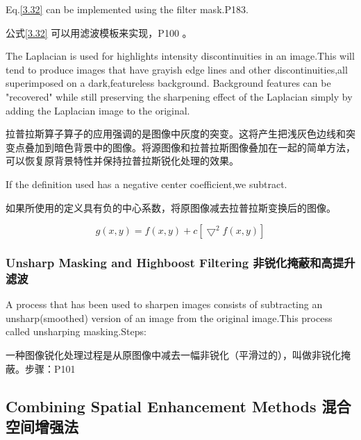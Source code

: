\documentclass[a4paper,12pt]{article}
\numberwithin{equation}{section}%
\begin{document}
Eq.\ref{3.32} can be implemented using the filter mask.P183.

公式\ref{3.32} 可以用滤波模板来实现，P100 。

The Laplacian is used for highlights intensity discontinuities in an image.This will tend to produce images that have grayish edge lines and other discontinuities,all superimposed on a dark,featureless background.
Background features can be "recovered" while still preserving the sharpening effect of the Laplacian simply by adding the Laplacian image to the original.

拉普拉斯算子算子的应用强调的是图像中灰度的突变。这将产生把浅灰色边线和突变点叠加到暗色背景中的图像。将源图像和拉普拉斯图像叠加在一起的简单方法，可以恢复原背景特性并保持拉普拉斯锐化处理的效果。

If the definition used has a negative center coefficient,we subtract.

如果所使用的定义具有负的中心系数，将原图像减去拉普拉斯变换后的图像。

\begin{equation} \label{3.33}
g(x,y)=f(x,y)+c[\bigtriangledown^{2}f(x,y)]
\end{equation}

\subsubsection{Unsharp Masking and Highboost Filtering 非锐化掩蔽和高提升滤波}

A process that has been used to sharpen images consists of subtracting an unsharp(smoothed) version of an image from the original image.This process called unsharping masking.Steps:

一种图像锐化处理过程是从原图像中减去一幅非锐化（平滑过的），叫做非锐化掩蔽。步骤：P101

\subsection{Combining Spatial Enhancement Methods 混合空间增强法}






  












\end{document}
